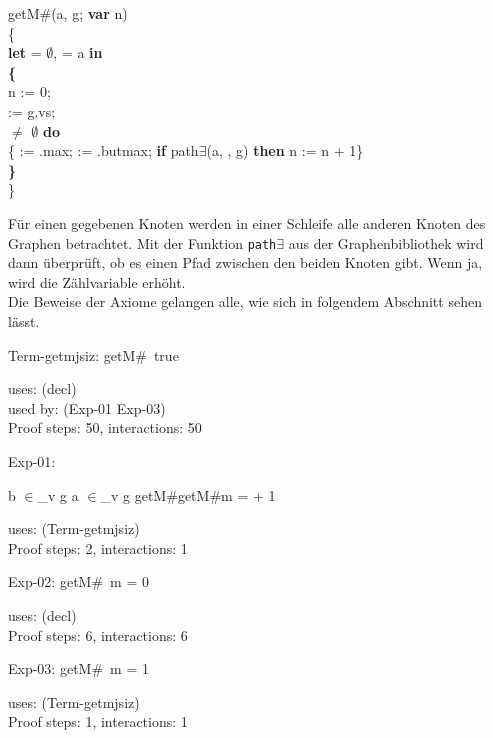 \medskip

getM\#(a, g; {\bf var} n) \\
\{\\
{\bf let}  = $\emptyset$,  = a {\bf in}\\
{\bf \{}\\
\tabbe n := 0;\\
\tabbe {} := g.vs;\\
  $\neq$ $\emptyset$ {\bf do}\\
\tabbe {} \{ := .max;  := .butmax; {\bf if} path$\exists$(a, , g) {\bf then} n := n + 1\}\\
{\bf \}}\\
\}

Für einen gegebenen Knoten werden in einer Schleife alle anderen Knoten des Graphen betrachtet. Mit der Funktion \texttt{path$\exists$} aus der Graphenbibliothek wird dann überprüft, ob es einen Pfad zwischen den beiden Knoten gibt. Wenn ja, wird die Zählvariable erhöht. \\
Die Beweise der Axiome gelangen alle, wie sich in folgendem Abschnitt sehen lässt. 
\medskip

Term-getmjsiz: 
 \Fol \Do getM\#\Dc\ true


uses: (decl)\\
used by: (Exp-01 Exp-03)\\
Proof steps: 50, interactions: 50

\medskip

Exp-01: 
\begin{flushleft}


\Fol

\Not b $\in$\_v g \And a $\in$\_v g \Imp \Do getM\#\Dc \Do getM\#\Dc m =  + 1

\end{flushleft}


uses: (Term-getmjsiz)\\
Proof steps: 2, interactions: 1

\medskip

Exp-02: 
 \Fol \Do getM\#\Dc\ m = 0


uses: (decl)\\
Proof steps: 6, interactions: 6

\medskip

Exp-03: 
 \Fol \Do getM\#\Dc\ m = 1


uses: (Term-getmjsiz)\\
Proof steps: 1, interactions: 1

